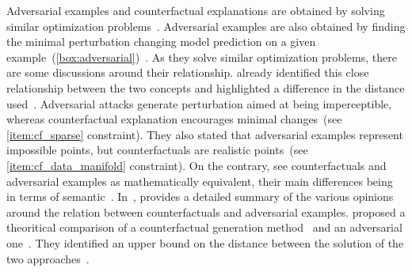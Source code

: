 \documentclass[../main.tex]{subfiles}
\begin{document}
	Adversarial examples and counterfactual explanations are obtained by solving similar optimization problems~\cite{Pawelczyk2021ExploringCE,Freiesleben2021}.
	Adversarial examples are also obtained by finding the minimal perturbation changing model prediction on a given example~(\cref{box:adversarial})~\cite{Szegedy2013IntriguingPO}.
	As they solve similar optimization problems, there are some discussions around their relationship.
	\citeauthor{wachter2017counterfactual} already identified this close relationship between the two concepts and highlighted a difference in the distance used~\cite{wachter2017counterfactual}.
	Adversarial attacks generate perturbation aimed at being imperceptible, whereas counterfactual explanation encourages minimal changes~(see \ref{item:cf_sparse} constraint).
	They also stated that adversarial examples represent impossible points, but counterfactuals are realistic points~(see \ref{item:cf_data_manifold} constraint).
	On the contrary, \citeauthor{browne2020} see counterfactuals and adversarial examples as mathematically equivalent, their main differences being in terms of semantic~\cite{browne2020}.
	In~\cite[][8]{Freiesleben2021}, \citeauthor{Freiesleben2021} provides a detailed summary of the various opinions around the relation between counterfactuals and adversarial examples.
	\citeauthor{Pawelczyk2021ExploringCE} proposed a theoritical comparison of a counterfactual generation method~\cite{wachter2017counterfactual} and an adversarial one~\cite{Carlini2016TowardsET}.
	They identified an upper bound on the distance between the solution of the two approaches~\cite{Pawelczyk2021ExploringCE}.
\end{document}
